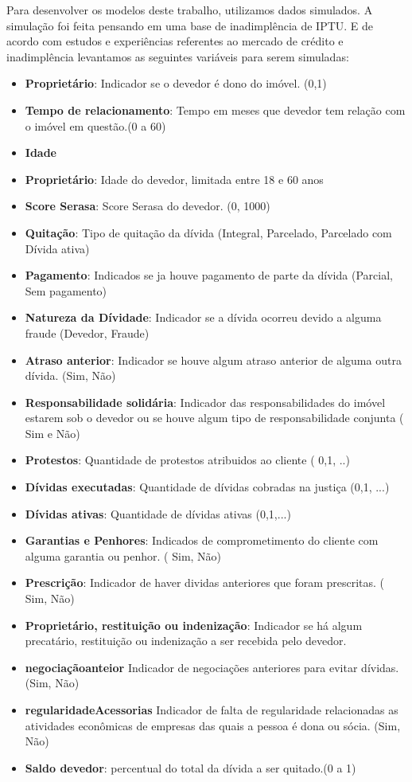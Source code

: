 \documentclass[12pt,a4paper]{article}
\begin{document}
Para desenvolver os modelos deste trabalho, utilizamos dados simulados. A simulação foi feita pensando em uma base de inadimplência de IPTU. E de acordo com estudos e experiências referentes ao mercado de crédito e inadimplência levantamos as seguintes variáveis para serem simuladas:

\begin{itemize}

 \item \textbf{Proprietário}: Indicador se o devedor é dono do imóvel. (0,1)
 \item \textbf{Tempo de relacionamento}: Tempo em meses que devedor tem relação com o imóvel em questão.(0 a 60)
 \item \textbf{Idade}
 \item \textbf{Proprietário}: Idade do devedor, limitada entre 18 e 60 anos
 \item \textbf{Score Serasa}: Score Serasa do devedor. (0, 1000)
 \item \textbf{Quitação}: Tipo de quitação da dívida (Integral, Parcelado, Parcelado com Dívida ativa)
 \item \textbf{Pagamento}: Indicados se ja houve pagamento de parte da dívida (Parcial, Sem pagamento)
 \item \textbf{Natureza da Dívidade}: Indicador se a dívida ocorreu devido a alguma fraude (Devedor, Fraude)
 \item \textbf{Atraso anterior}: Indicador se houve algum atraso anterior de alguma outra dívida. (Sim, Não)
 \item \textbf{Responsabilidade solidária}: Indicador das responsabilidades do imóvel estarem sob o devedor ou se houve algum tipo de responsabilidade conjunta ( Sim e Não)
 \item \textbf{Protestos}: Quantidade de protestos atribuidos ao cliente ( 0,1, ..)
 \item \textbf{Dívidas executadas}: Quantidade de dívidas cobradas na justiça (0,1, ...)
 \item \textbf{Dívidas ativas}: Quantidade de dívidas ativas (0,1,...)
  \item \textbf{Garantias e Penhores}: Indicados de comprometimento do cliente com alguma garantia ou penhor. ( Sim, Não)
  \item \textbf{Prescrição}: Indicador de haver dividas anteriores que foram prescritas. ( Sim, Não)
  \item \textbf{Proprietário, restituição ou indenização}: Indicador se há algum precatário, restituição ou indenização a ser recebida pelo devedor.
  \item \textbf{negociaçãoanteior} Indicador de negociações anteriores para evitar dívidas.  (Sim, Não)
  \item \textbf{regularidadeAcessorias} Indicador de falta de regularidade relacionadas as atividades econômicas de empresas das quais a pessoa é dona ou sócia. (Sim, Não)
  \item \textbf{Saldo devedor}: percentual do total da dívida a ser quitado.(0 a 1)
     
\end{itemize}
\end{document}
